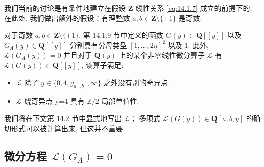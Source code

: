 我们当前的讨论是有条件地建立在假设 \(\mathbf{Z}\)-线性关系 \eqref{eq:14.1.7} 成立的前提下的. 
在此处, 我们做出额外的假设：有理整数 \(a, b \in \mathbf{Z} \setminus \{\pm 1\}\) 是奇数.

\begin{proposition}\label{prop:14.1.11}
对于奇数 \(a, b \in \mathbf{Z} \setminus \{\pm 1\}\), 
第 14.1.9 节中定义的函数 \(G(y) \in \mathbf{Q}[\![y]\!]\) 以及 \(G_A(y) \in \mathbf{Q}[\![y]\!]\) 
分别具有分母类型 \([1, \ldots, 2n]^2\) 以及 1. 
此外, \(\mathcal{L}(G_A(y)) = 0\) 并且对于 \(\mathbf{Q}(y)\) 上的某个非零线性微分算子 \(\mathcal{L}\) 
有 \(\mathcal{L}(G(y)) \in \mathbf{Q}[\![y]\!]\), 该算子满足:
\begin{itemize}
  \item[(1)] \(\mathcal{L}\) 除了 \(y \in \{0, 4, y_{a^{\pm}, b^{\pm}}, \infty\}\) 之外没有别的奇异点.
  \item[(2)] \(\mathcal{L}\) 绕奇异点 y=4 具有 \(\mathbb{Z}/2\) 局部单值性.
\end{itemize}
\end{proposition}

我们将在下文第 14.2 节中显式地写出 \(\mathcal{L}\)； 
多项式 \(\mathcal{L}(G(y)) \in \mathbf{Q}[a, b, y]\) 的确切形式可以被计算出来, 但这并不重要.

\subsection{微分方程 \(\mathcal{L}(G_A) = 0\)}\label{sec:14.2}

